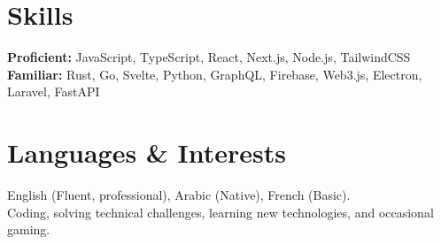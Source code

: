 \documentclass[10pt,a4paper]{article}
\newcommand{\head}[1]{{\section*{#1}}}
\begin{document}
\head{Skills}
\textbf{Proficient:} JavaScript, TypeScript, React, Next.js, Node.js, TailwindCSS\\
\textbf{Familiar:} Rust, Go, Svelte, Python, GraphQL, Firebase, Web3.js, Electron, Laravel, FastAPI

\head{Languages \& Interests}
English (Fluent, professional), Arabic (Native), French (Basic).\\
Coding, solving technical challenges, learning new technologies, and occasional gaming.
\end{document}
